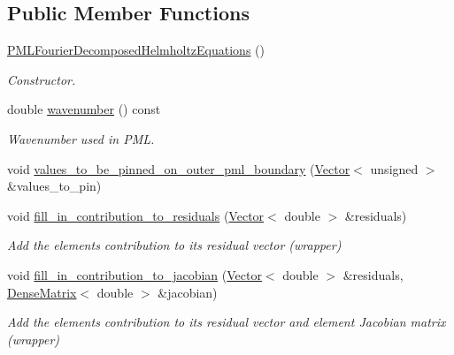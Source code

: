 \subsection*{Public Member Functions}
\begin{DoxyCompactItemize}
\item 
\hyperlink{classoomph_1_1PMLFourierDecomposedHelmholtzEquations_a83af47120c6e24e05a26c82a6e66f838}{P\+M\+L\+Fourier\+Decomposed\+Helmholtz\+Equations} ()
\begin{DoxyCompactList}\small\item\em Constructor. \end{DoxyCompactList}\item 
double \hyperlink{classoomph_1_1PMLFourierDecomposedHelmholtzEquations_aca9ab7f8c621cd3d59fb73d7e2828dc0}{wavenumber} () const
\begin{DoxyCompactList}\small\item\em Wavenumber used in P\+ML. \end{DoxyCompactList}\item 
void \hyperlink{classoomph_1_1PMLFourierDecomposedHelmholtzEquations_aa77f94ee3063a39d0e0cb7da973b155a}{values\+\_\+to\+\_\+be\+\_\+pinned\+\_\+on\+\_\+outer\+\_\+pml\+\_\+boundary} (\hyperlink{classoomph_1_1Vector}{Vector}$<$ unsigned $>$ \&values\+\_\+to\+\_\+pin)
\item 
void \hyperlink{classoomph_1_1PMLFourierDecomposedHelmholtzEquations_a0f9351b288c3e99e0661784899ac24d1}{fill\+\_\+in\+\_\+contribution\+\_\+to\+\_\+residuals} (\hyperlink{classoomph_1_1Vector}{Vector}$<$ double $>$ \&residuals)
\begin{DoxyCompactList}\small\item\em Add the element\textquotesingle{}s contribution to its residual vector (wrapper) \end{DoxyCompactList}\item 
void \hyperlink{classoomph_1_1PMLFourierDecomposedHelmholtzEquations_a0b3c686dae6cb871f048545be7c5f1e4}{fill\+\_\+in\+\_\+contribution\+\_\+to\+\_\+jacobian} (\hyperlink{classoomph_1_1Vector}{Vector}$<$ double $>$ \&residuals, \hyperlink{classoomph_1_1DenseMatrix}{Dense\+Matrix}$<$ double $>$ \&jacobian)
\begin{DoxyCompactList}\small\item\em Add the element\textquotesingle{}s contribution to its residual vector and element Jacobian matrix (wrapper) \end{DoxyCompactList}\end{DoxyCompactItemize}
